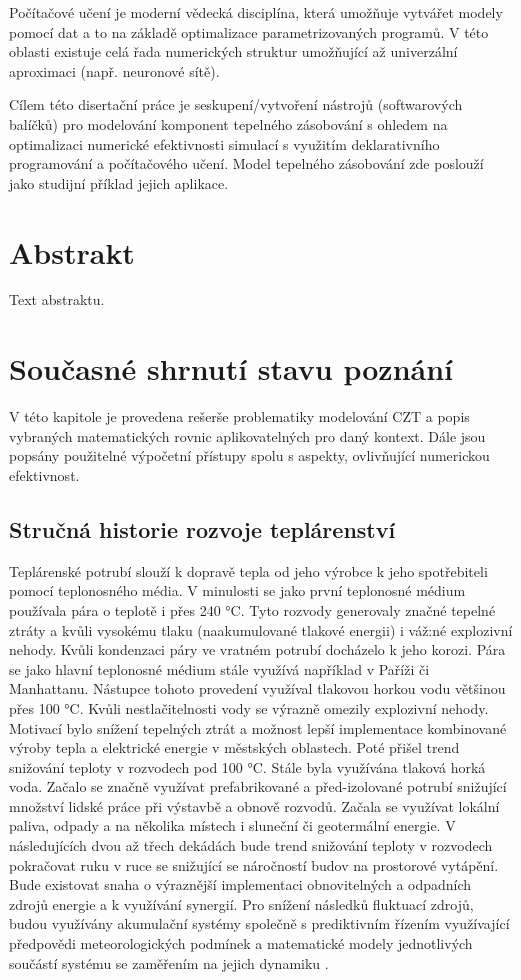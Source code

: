 Počítačové učení je moderní vědecká disciplína, která umožňuje vytvářet modely 
pomocí dat a to na základě optimalizace parametrizovaných programů. V této 
oblasti existuje celá řada numerických struktur umožňující až univerzální 
aproximaci (např. neuronové sítě).

Cílem této disertační práce je seskupení/vytvoření nástrojů (softwarových 
balíčků) pro modelování komponent tepelného zásobování s ohledem na 
optimalizaci numerické efektivnosti simulací s využitím deklarativního 
programování a počítačového učení. Model tepelného zásobování zde poslouží jako 
studijní příklad jejich aplikace.

\chapter{Abstrakt}
\label{abstrakt}
Text abstraktu.

\chapter{Současné shrnutí stavu poznání} 
\label{struktura}
V této kapitole je provedena rešerše problematiky modelování CZT a popis 
vybraných matematických rovnic aplikovatelných pro daný kontext. Dále jsou 
popsány použitelné výpočetní přístupy spolu s aspekty, ovlivňující numerickou 
efektivnost. 

\section{Stručná historie rozvoje teplárenství}
Teplárenské potrubí slouží k dopravě tepla od jeho výrobce k jeho spotřebiteli 
pomocí teplonosného média. V minulosti se jako první teplonosné médium 
používala pára o teplotě i přes 240 °C. Tyto rozvody generovaly značné tepelné 
ztráty a kvůli vysokému tlaku (naakumulované tlakové energii) i váž:né 
explozivní nehody. Kvůli kondenzaci páry ve vratném potrubí docházelo k jeho 
korozi. Pára se jako hlavní teplonosné médium stále využívá například v Paříži 
či Manhattanu. Nástupce tohoto provedení využíval tlakovou horkou vodu většinou 
přes 100 °C. Kvůli nestlačitelnosti vody se výrazně omezily explozivní nehody. 
Motivací bylo snížení tepelných ztrát a možnost lepší implementace kombinované 
výroby tepla a elektrické energie v městských oblastech. Poté přišel trend 
snižování teploty v rozvodech pod 100 °C. Stále byla využívána tlaková horká 
voda. Začalo se značně využívat prefabrikované a před-izolované potrubí 
snižující množství lidské práce při výstavbě a obnově rozvodů. Začala se 
využívat lokální paliva, odpady a na několika místech i sluneční či geotermální 
energie. V následujících dvou až třech dekádách bude trend snižování teploty v 
rozvodech pokračovat ruku v ruce se snižující se náročností budov na prostorové 
vytápění. Bude existovat snaha o výraznější implementaci obnovitelných a 
odpadních zdrojů energie a k využívání synergií. Pro snížení následků fluktuací 
zdrojů, budou využívány akumulační systémy společně s prediktivním řízením 
využívající předpovědi meteorologických podmínek a matematické modely 
jednotlivých součástí systému se zaměřením na jejich dynamiku \cite{Lund2014}.

